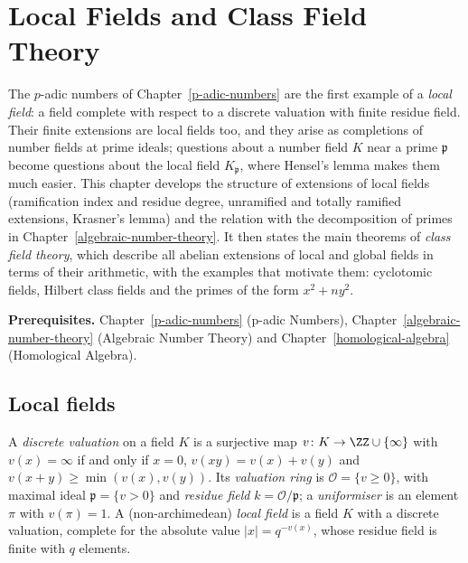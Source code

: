 \chapter{Local Fields and Class Field Theory}\label{local-fields}

The $p$-adic numbers of Chapter~\ref{p-adic-numbers} are the first example of a \emph{local field}: a field complete with respect to a discrete valuation with finite residue field. Their finite
extensions are local fields too, and they arise as completions of number fields at prime ideals; questions about a number field $K$ near a prime $\mathfrak{p}$ become questions about the local field
$K_\mathfrak{p}$, where Hensel's lemma makes them much easier. This chapter develops the structure of extensions of local fields (ramification index and residue degree, unramified and totally ramified
extensions, Krasner's lemma) and the relation with the decomposition of primes in Chapter~\ref{algebraic-number-theory}. It then states the main theorems of \emph{class field theory}, which describe
all abelian extensions of local and global fields in terms of their arithmetic, with the examples that motivate them: cyclotomic fields, Hilbert class fields and the primes of the form $x^2 + ny^2$.

\noindent\textbf{Prerequisites.} Chapter~\ref{p-adic-numbers} (p-adic Numbers), Chapter~\ref{algebraic-number-theory} (Algebraic Number Theory) and Chapter~\ref{homological-algebra} (Homological Algebra).

\section{Local fields}\label{local-fields:section-local-fields}

\begin{definition}\label{local-fields:definition-local-field}
A \emph{discrete valuation} on a field $K$ is a surjective map $v \colon K \to \ZZ \cup \{\infty\}$ with $v(x) = \infty$ if and only if $x = 0$, $v(xy) = v(x) + v(y)$ and
$v(x + y) \geq \min(v(x), v(y))$. Its \emph{valuation ring} is $\mathcal{O} = \{v \geq 0\}$, with maximal ideal $\mathfrak{p} = \{v > 0\}$ and \emph{residue field} $k = \mathcal{O}/\mathfrak{p}$; a
\emph{uniformiser} is an element $\pi$ with $v(\pi) = 1$. A (non-archimedean) \emph{local field} is a field $K$ with a discrete valuation, complete for the absolute value $|x| = q^{-v(x)}$, whose residue field is
finite with $q$ elements.
\end{definition}

